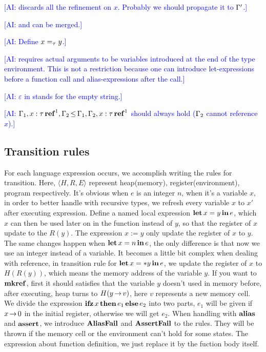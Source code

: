 \documentclass[runningheads]{llncs}
\newcommand{\AI}[1]{\textcolor{blue}{[AI: #1]\marginpar{$\longleftarrow$}}}
\begin{document}
\AI{ discards all the refinement on \(x\).  Probably we should propagate it to $\Gamma'$.}

\AI{ and  can be merged.}

\AI{Define \(x =_\tau y\).}

\AI{ requires actual arguments to be variables introduced at the end of the type environment.  This is not a restriction because one can introduce let-expressions before a function call and alias-expressions after the call.}

\AI{$\varepsilon$ in  stands for the empty string.}

\AI{$\Gamma_1, x:\tau \operatorname{\mathbf{ref}}^1, \Gamma_2 \operatorname{\le} \Gamma_1, \Gamma_2, x:\tau \operatorname{\mathbf{ref}}^1$ should always hold ($\Gamma_2$ cannot reference $x$).}

\subsection{Transition rules}
For each language expression occurs, we accomplish writing the rules for transition. Here, $\langle H, R, E \rangle$ represent heap(memory),
register(environment), program respectively.
It's obvious when $e$ is an integer $n$, when it's a variable $x$, in order to better handle with recursive types,
we refresh every variable $x$ to $x'$ after executing expression.
Define a named local expression $\operatorname{\mathbf{let}} x=y \operatorname{\mathbf{in}} e$, which $x$ can then be used later on in the function instead of $y$, so that the
register of $x$ update to the $R(y)$.
The expression $x:=y$ only update the register of $x$ to $y$.
The same changes happen when $\operatorname{\mathbf{let}} x=n \operatorname{\mathbf{in}} e$, the only difference is that now we use an integer instead of a variable.
It becomes a little bit complex when dealing with reference, in transition rule for $\operatorname{\mathbf{let}} x=*y \operatorname{\mathbf{in}} e$, we update the register of $x$ to $H(R(y))$,
which means the memory address of the variable $y$.
If you want to $\operatorname{\mathbf{mkref}}$, first it should satisfies that the variable $y$ doesn't used in memory before, after executing, heap
turns to $H(y\operatorname{\rightarrow} v)$, here $v$ represents a new memory cell.
We divide the expression $\operatorname{\mathbf{ifz}} x\operatorname{\mathbf{then}} e_1 \operatorname{\mathbf{else}} e_2$ into two parts, $e_1$ will be given if $x\operatorname{\rightarrow} 0$ in the initial register,
otherwise we will get $e_2$.
When handling with $\mathbf{alias}$ and $\mathbf{assert}$, we introduce $\bf{AliasFail}$ and $\bf{AssertFail}$ to the rules. They will be thrown if the memory cell or
the environment can't hold for some states.
The expression about function definition, we just replace it by the fuction body itself.
\end{document}
